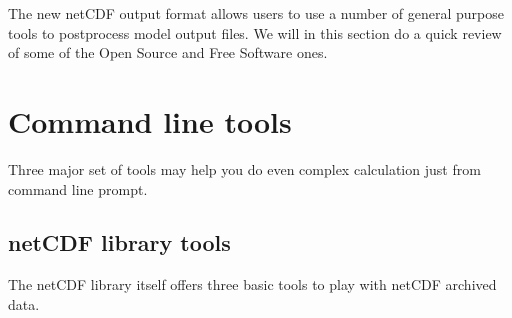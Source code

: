 
The new netCDF output format allows users to use a number of general purpose
tools to postprocess model output files. We will in this section do a quick
review of some of the Open Source and Free Software ones.

\section{Command line tools}

Three major set of tools may help you do even complex calculation just from
command line prompt. 

\subsection{netCDF library tools}

The netCDF library itself offers three basic tools to play with netCDF
archived data.

